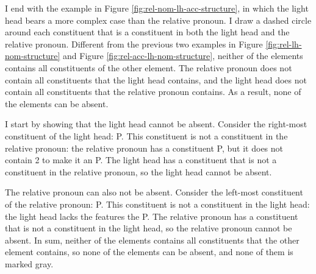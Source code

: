 I end with the example in Figure \ref{fig:rel-nom-lh-acc-structure}, in which the light head bears a more complex case than the relative pronoun.
I draw a dashed circle around each constituent that is a constituent in both the light head and the relative pronoun. Different from the previous two examples in Figure \ref{fig:rel-lh-nom-structure} and Figure \ref{fig:rel-acc-lh-nom-structure}, neither of the elements contains all constituents of the other element. The relative pronoun does not contain all constituents that the light head contains, and the light head does not contain all constituents that the relative pronoun contains. As a result, none of the elements can be absent.

I start by showing that the light head cannot be absent.
Consider the right-most constituent of the light head: P. This constituent is not a constituent in the relative pronoun: the relative pronoun has a constituent P, but it does not contain 2 to make it an P.
The light head has a constituent that is not a constituent in the relative pronoun, so the light head cannot be absent.

The relative pronoun can also not be absent.
Consider the left-most constituent of the relative pronoun: P. This constituent is not a constituent in the light head: the light head lacks the features the P.
The relative pronoun has a constituent that is not a constituent in the light head, so the relative pronoun cannot be absent.
In sum, neither of the elements contains all constituents that the other element contains, so none of the elements can be absent, and none of them is marked gray.

